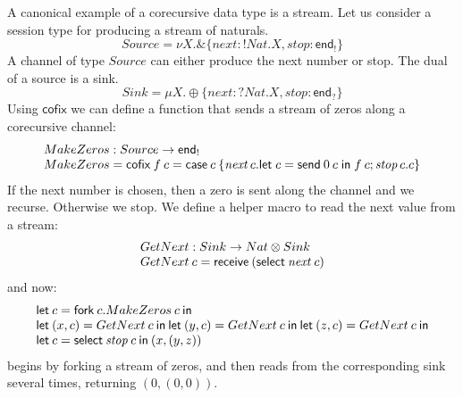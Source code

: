 \documentclass[orivec,envcountsame]{llncs}
\makeatletter
\newcommand{\with}{\mathbin\binampersand}
\newcommand{\gvout}[2]{{!#1.#2}}
\newcommand{\gvin}[2]{{?#1.#2}}
\newcommand{\lto}{\ensuremath{\multimap}}
\newcommand{\uto}{\ensuremath{\rightarrow}}
\newcommand{\outterm}{\mkwd{end}_!}
\newcommand{\interm}{\mkwd{end}_?}
\newcommand{\mkwd}[1]{\mathsf{#1}}
\newcommand{\clabel}[1]{\mathit{#1}}
\newcommand{\gvsend}[2]{\mkwd{send}\:#1\:#2}
\newcommand{\gvreceive}[1]{\mkwd{receive}\:#1}
\newcommand{\gvlet}[3]{\mkwd{let}\;#1 = #2\;\mkwd{in}\;#3}
\newcommand{\gvselect}[2]{\mkwd{select}\:#1\:#2}
\newcommand{\gvcase}[2]{\mkwd{case}\:#1\:\{#2\}}
\newcommand{\gvfork}[2]{\mkwd{fork}\:#1.#2}
\newcommand{\lrkwd}{\mkwd{cofix}}
\newcommand{\key}{\mkwd}
\newcommand{\cofix}{\lrkwd}
\newcommand{\ba}{\begin{array}}
\newcommand{\ea}{\end{array}}
\newcommand{\bl}{\ba[t]{@{}l@{}}}
\newcommand{\el}{\ea}
\makeatother
\begin{document}
A canonical example of a corecursive data type is a stream. Let us consider a session type for
producing a stream of naturals.
%
\small
\[
Source = \nu X.\with \{\clabel{next}: \gvout{Nat}{X}, \clabel{stop}: \outterm \}
\]
\normalsize
%
A channel of type $Source$ can either produce the next number or stop. The dual of a source is a
sink.
\small
\[
Sink = \mu X.\oplus \{\clabel{next}: \gvin{Nat}{X}, \clabel{stop}: \interm \}
\]
\normalsize
%
Using $\cofix$ we can define a function that sends a stream of zeros along a corecursive channel:
\small
\[
  \bl
  MakeZeros : Source \uto \outterm \\
  MakeZeros = \cofix\:f\:c = \gvcase{c}{\clabel{next}\,c.\gvlet{c}{\gvsend{0}{c}}{f\:c};
                                        \clabel{stop}\,c.c}
  \el
\]
\normalsize
If the next number is chosen, then a zero is sent along the channel and we recurse. Otherwise we
stop.
%
%
We define a helper macro to read the next value from a stream:
\small\[
\bl
GetNext : Sink \uto Nat \otimes Sink \\
GetNext\:c = \gvreceive{(\gvselect{\clabel{next}}{c})} \\
\el
\]\normalsize
and now:
\small\[
\bl
\key{let}\:c = \gvfork{c}{MakeZeros\:c}\:\key{in} \\
\key{let}\:(x, c) = GetNext\:c\:\key{in}\:
\key{let}\:(y, c) = GetNext\:c\:\key{in}\:
\key{let}\:(z, c) = GetNext\:c\:\key{in} \\
\key{let}\:c = \gvselect{\clabel{stop}}{c}\:\key{in}\:(x, (y, z)) \\
\el
\]\normalsize
begins by forking a stream of zeros, and then reads from the corresponding sink several times,
returning $(0, (0, 0))$.

\end{document}
